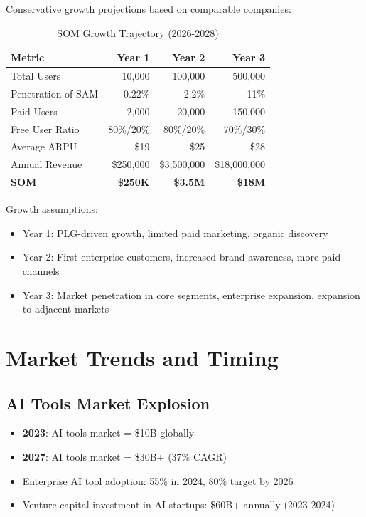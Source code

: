 \documentclass{report}
\begin{document}
Conservative growth projections based on comparable companies:

\begin{table}[h]
\centering
\begin{tabular}{|l|r|r|r|}
\toprule
\textbf{Metric} & \textbf{Year 1} & \textbf{Year 2} & \textbf{Year 3} \\
\midrule
Total Users & 10,000 & 100,000 & 500,000 \\
Penetration of SAM & 0.22\% & 2.2\% & 11\% \\
Paid Users & 2,000 & 20,000 & 150,000 \\
Free User Ratio & 80\%/20\% & 80\%/20\% & 70\%/30\% \\
Average ARPU & \$19 & \$25 & \$28 \\
Annual Revenue & \$250,000 & \$3,500,000 & \$18,000,000 \\
\midrule
\textbf{SOM} & \textbf{\$250K} & \textbf{\$3.5M} & \textbf{\$18M} \\
\bottomrule
\end{tabular}
\caption{SOM Growth Trajectory (2026-2028)}
\end{table}

Growth assumptions:
\begin{itemize}
    \item Year 1: PLG-driven growth, limited paid marketing, organic discovery
    \item Year 2: First enterprise customers, increased brand awareness, more paid channels
    \item Year 3: Market penetration in core segments, enterprise expansion, expansion to adjacent markets
\end{itemize}

\section{Market Trends and Timing}

\subsection{AI Tools Market Explosion}

\begin{itemize}
    \item \textbf{2023}: AI tools market = \$10B globally
    \item \textbf{2027}: AI tools market = \$30B+ (37\% CAGR)
    \item Enterprise AI tool adoption: 55\% in 2024, 80\% target by 2026
    \item Venture capital investment in AI startups: \$60B+ annually (2023-2024)
\end{itemize}
\end{document}
